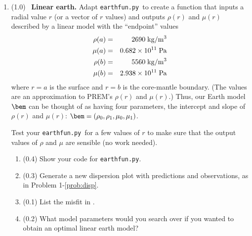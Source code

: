 \documentclass[11pt,titlepage,fleqn]{article}
\newcommand{\tfileef}{{\tt earthfun.py}}
\begin{document}
\begin{enumerate}
\begin{enumerate}
\item (0.3) Repeat, but now use only the observed eigenfrequency for  ($N=1$) instead of $N=20$. (This means that all but one of the observations in your plot will not have been used in determining the new~$\mu$.)
{\bf For this $\mu$ value, show all predictions and all observations in your plot, not just the ones used in calculating the misfit.}

What is the percent difference from the observed value, $100\,\ln(f/f_{\rm obs})$, for ?

\item (0.0) Summarize your tests in .
\end{enumerate}

\label{prob:earth_homo}


\item (1.0) \ptag\ {\bf Linear earth.} Adapt \tfileef\ to create a function that inputs a radial value $r$ (or a vector of $r$ values) and outputs $\rho(r)$ and $\mu(r)$ described by a linear model with the ``endpoint'' values
%
\begin{eqnarray*}
\rho(a) &=& 2690 \; {\rm kg/m^3}
\\
\mu(a) &=& 0.682 \times 10^{11} \; {\rm Pa}
\\
\rho(b) &=& 5560 \; {\rm kg/m^3}
\\
\mu(b) &=& 2.938 \times 10^{11} \; {\rm Pa}
\end{eqnarray*}
%
where $r=a$ is the surface and $r=b$ is the core-mantle boundary. (The values are an approximation to PREM's $\rho(r)$ and $\mu(r)$.) Thus, our Earth model $\bem$ can be thought of as having four parameters, the intercept and slope of $\rho(r)$ and $\mu(r)$: $\bem = (\rho_0,\rho_1,\mu_0,\mu_1)$.

Test your \tfileef\ for a few values of $r$ to make sure that the output values of $\rho$ and $\mu$ are sensible (no work needed).


\begin{enumerate}
\item (0.4) Show your code for \tfileef.
\item (0.3) Generate a new dispersion plot with predictions and observations, as in Problem 1-\ref{prob:disp}.
\item (0.1) List the misfit in .
\item (0.2) What model parameters would you search over if you wanted to obtain an optimal linear earth model?
\end{enumerate}


\end{enumerate}
\end{document}

